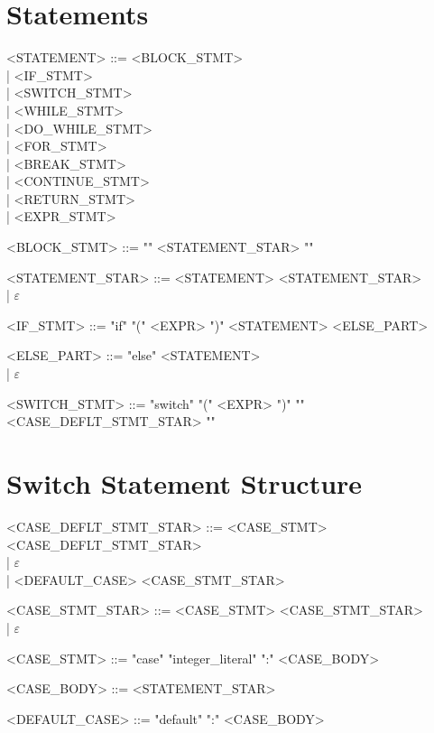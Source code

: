 \section{Statements}
\begin{grammar}
      <STATEMENT> ::= <BLOCK\_STMT> \\
      | <IF\_STMT> \\
      | <SWITCH\_STMT> \\
      | <WHILE\_STMT> \\
      | <DO\_WHILE\_STMT> \\
      | <FOR\_STMT> \\
      | <BREAK\_STMT> \\
      | <CONTINUE\_STMT> \\
      | <RETURN\_STMT> \\
      | <EXPR\_STMT>

      <BLOCK\_STMT> ::= "{" <STATEMENT\_STAR> "}"

      <STATEMENT\_STAR> ::= <STATEMENT> <STATEMENT\_STAR> \\
      | $\varepsilon$

      <IF\_STMT> ::= "if" "(" <EXPR> ")" <STATEMENT> <ELSE\_PART>

      <ELSE\_PART> ::= "else" <STATEMENT> \\
      | $\varepsilon$

      <SWITCH\_STMT> ::= "switch" "(" <EXPR> ")" "{" <CASE\_DEFLT\_STMT\_STAR> "}"
\end{grammar}

\section{Switch Statement Structure}
\begin{grammar}
      <CASE\_DEFLT\_STMT\_STAR> ::= <CASE\_STMT> <CASE\_DEFLT\_STMT\_STAR> \\
      | $\varepsilon$ \\
      | <DEFAULT\_CASE> <CASE\_STMT\_STAR>

      <CASE\_STMT\_STAR> ::= <CASE\_STMT> <CASE\_STMT\_STAR> \\
      | $\varepsilon$

      <CASE\_STMT> ::= "case" "integer_literal" ":" <CASE\_BODY>

      <CASE\_BODY> ::= <STATEMENT\_STAR>

      <DEFAULT\_CASE> ::= "default" ":" <CASE\_BODY>
\end{grammar}

